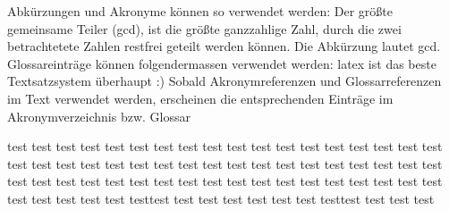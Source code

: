 Abkürzungen und Akronyme können so verwendet werden: Der größte gemeinsame Teiler (\acrlong{gcd}), ist die größte ganzzahlige Zahl, durch die
zwei betrachtetete Zahlen restfrei geteilt werden können.
Die Abkürzung lautet \acrshort{gcd}.\\
Glossareinträge können folgendermassen verwendet werden:  \Gls{latex} ist das beste Textsatzsystem überhaupt :) 
Sobald Akronymreferenzen und Glossarreferenzen im Text verwendet werden, erscheinen die entsprechenden Einträge im Akronymverzeichnis bzw. Glossar

test test test test test test test test test test test test test test test test test test test test test test test test test test test test test test test test test test test test test test test test test test test test test test test test test test test test test test test test test test test testtest test test test test test test testtest test test test



